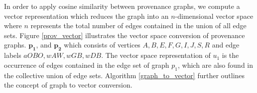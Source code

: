 \par In order to apply cosine similarity between provenance graphs, we compute a vector representation which reduces the graph into an $n$-dimensional vector space where $n$ represents the total number of edges contained in the union of all edge sets. Figure \ref{prov_vector} illustrates the vector space conversion of provenance graphs. $\boldsymbol{p_1}$, and $\boldsymbol{p_2}$ which consists of vertices $A,B,E,F,G, I, J, S, R$ and edge labels $aOBO, wAW, wGB, wDB$. The vector space representation of $u_1$ is the occurrence of edges contained in the edge set of graph $p_1$, which  are also found in the collective union of edge sets. Algorithm \ref{graph_to_vector} further outlines the concept of graph to vector conversion.
%
%
%
%




